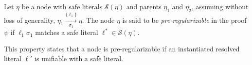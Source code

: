 

\begin{definition}
\label{prop:pair}
Let $\eta$ be a node with safe literals $\mathcal{S}(\eta)$ and parents $\eta_1$ and $\eta_2$, assuming without loss of generality, $\eta_1 \xrightarrow[\sigma_1]{\{\ell_1\} } \eta$.
The node $\eta$ is said to be \emph{pre-regularizable} in the proof $\psi$ if $\ell_1\sigma_1$ matches a safe literal $\ell^* \in \mathcal{S}(\eta)$.
\end{definition}

\noindent
This property states that a node is pre-regularizable if an instantiated resolved literal $\ell'$ is unifiable with a safe literal.



